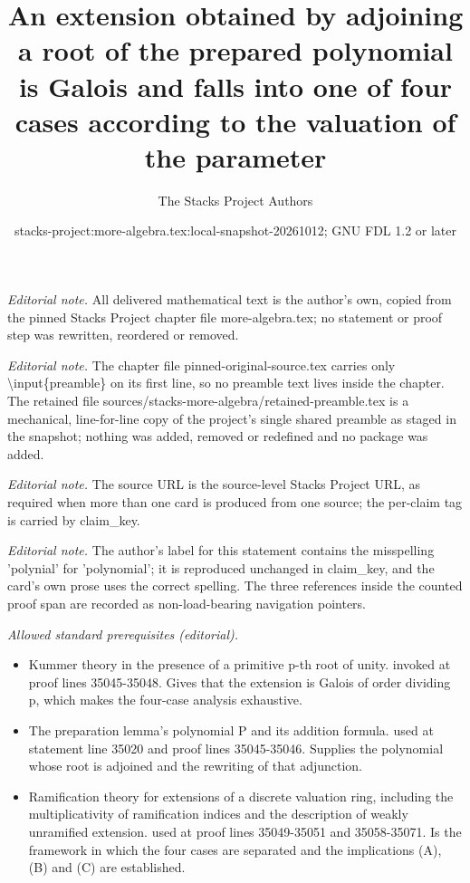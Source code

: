 \documentclass[10pt,a4paper]{amsart}
\title{An extension obtained by adjoining a root of the prepared polynomial is Galois and falls into one of four cases according to the valuation of the parameter}
\author{The Stacks Project Authors}
\date{stacks-project:more-algebra.tex:local-snapshot-20261012; GNU FDL 1.2 or later}
\theoremstyle{plain}
\theoremstyle{definition}
\theoremstyle{remark}
\numberwithin{equation}{subsection}
\begin{document}
\maketitle
\setcounter{subsection}{1}
\noindent\textit{Editorial note.} All delivered mathematical text is the author's own, copied from the pinned Stacks Project chapter file more-algebra.tex; no statement or proof step was rewritten, reordered or removed.\par\medskip
\noindent\textit{Editorial note.} The chapter file pinned-original-source.tex carries only \textbackslash{}input\{preamble\} on its first line, so no preamble text lives inside the chapter. The retained file sources/stacks-more-algebra/retained-preamble.tex is a mechanical, line-for-line copy of the project's single shared preamble as staged in the snapshot; nothing was added, removed or redefined and no package was added.\par\medskip
\noindent\textit{Editorial note.} The source URL is the source-level Stacks Project URL, as required when more than one card is produced from one source; the per-claim tag is carried by claim\_key.\par\medskip
\noindent\textit{Editorial note.} The author's label for this statement contains the misspelling 'polynial' for 'polynomial'; it is reproduced unchanged in claim\_key, and the card's own prose uses the correct spelling. The three references inside the counted proof span are recorded as non-load-bearing navigation pointers.\par\medskip
\noindent\textit{Allowed standard prerequisites (editorial).}\begin{itemize}
\item Kummer theory in the presence of a primitive p-th root of unity. invoked at proof lines 35045-35048. Gives that the extension is Galois of order dividing p, which makes the four-case analysis exhaustive.
\item The preparation lemma's polynomial P and its addition formula. used at statement line 35020 and proof lines 35045-35046. Supplies the polynomial whose root is adjoined and the rewriting of that adjunction.
\item Ramification theory for extensions of a discrete valuation ring, including the multiplicativity of ramification indices and the description of weakly unramified extension. used at proof lines 35049-35051 and 35058-35071. Is the framework in which the four cases are separated and the implications (A), (B) and (C) are established.
\end{itemize}\medskip
\end{document}
